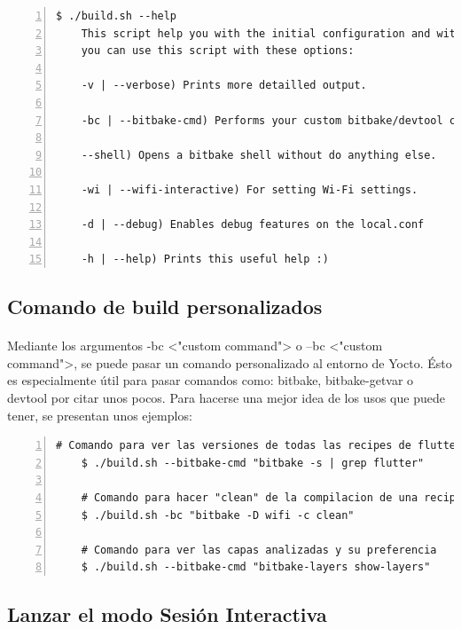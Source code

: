\begin{lstlisting}[style=consola, numbers=left]
    $ ./build.sh --help
    This script help you with the initial configuration and with the build process.
    you can use this script with these options:

    -v | --verbose) Prints more detailled output.

    -bc | --bitbake-cmd) Performs your custom bitbake/devtool command.

    --shell) Opens a bitbake shell without do anything else.

    -wi | --wifi-interactive) For setting Wi-Fi settings.

    -d | --debug) Enables debug features on the local.conf

    -h | --help) Prints this useful help :)
\end{lstlisting}

\subsection{Comando de build personalizados}

\paragraph{}Mediante los argumentos -bc <"custom command"> o --bc <"custom command">,
se puede pasar un comando personalizado al entorno de Yocto. Ésto es especialmente útil
para pasar comandos como: bitbake, bitbake-getvar o devtool por citar unos pocos. Para
hacerse una mejor idea de los usos que puede tener, se presentan unos ejemplos:

\begin{lstlisting}[style=consola, numbers=left]
    # Comando para ver las versiones de todas las recipes de flutter
    $ ./build.sh --bitbake-cmd "bitbake -s | grep flutter"

    # Comando para hacer "clean" de la compilacion de una recipe especifica
    $ ./build.sh -bc "bitbake -D wifi -c clean"

    # Comando para ver las capas analizadas y su preferencia
    $ ./build.sh --bitbake-cmd "bitbake-layers show-layers"
\end{lstlisting}

\subsection{Lanzar el modo Sesión Interactiva}


